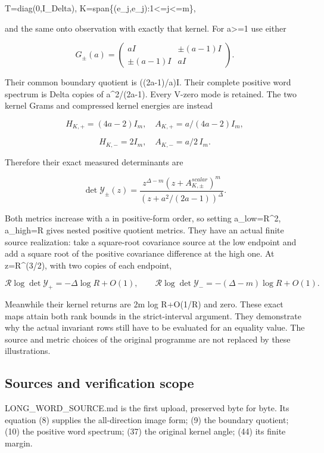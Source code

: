 \documentclass[11pt]{article}
\begin{document}
T=diag(0,I\_Delta), K=span\{(e\_j,e\_j):1\textless=j\textless=m\},

and the same onto observation with exactly that kernel. For a\textgreater=1 use either

\[
G_\pm(a)=\begin{pmatrix}aI&\pm(a-1)I\\\pm(a-1)I&aI\end{pmatrix}.
\]

Their common boundary quotient is ((2a-1)/a)I. Their complete positive word spectrum is Delta copies of a\^{}2/(2a-1). Every V-zero mode is retained. The two kernel Grams and compressed kernel energies are instead

\[
H_{K,+}=(4a-2)I_m,\quad A_{K,+}=a/(4a-2)I_m,
\]

\[
H_{K,-}=2I_m,\quad A_{K,-}=a/2\,I_m.
\]

Therefore their exact measured determinants are

\[
\det\mathscr Y_\pm(z)
=\frac{z^{\Delta-m}(z+A_{K,\pm}^{scalar})^m}
{(z+a^2/(2a-1))^\Delta}.
\]

Both metrics increase with a in positive-form order, so setting a\_low=R\^{}2, a\_high=R gives nested positive quotient metrics. They have an actual finite source realization: take a square-root covariance source at the low endpoint and add a square root of the positive covariance difference at the high one. At z=R\^{}(3/2), with two copies of each endpoint,

\[
\mathcal R\log\det\mathscr Y_+=-\Delta\log R+O(1),\qquad
\mathcal R\log\det\mathscr Y_-=-(\Delta-m)\log R+O(1).
\]

Meanwhile their kernel returns are 2m log R+O(1/R) and zero. These exact maps attain both rank bounds in the strict-interval argument. They demonstrate why the actual invariant rows still have to be evaluated for an equality value. The source and metric choices of the original programme are not replaced by these illustrations.

\subsection{Sources and verification scope}\label{sources-and-verification-scope}

LONG\_WORD\_SOURCE.md is the first upload, preserved byte for byte. Its equation (8) supplies the all-direction image form; (9) the boundary quotient; (10) the positive word spectrum; (37) the original kernel angle; (44) its finite margin.
\end{document}
